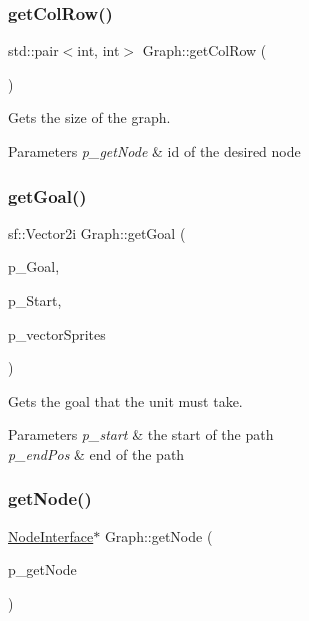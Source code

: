 \subsubsection{\texorpdfstring{get\+Col\+Row()}{getColRow()}}
{\footnotesize\ttfamily std\+::pair$<$int, int$>$ Graph\+::get\+Col\+Row (\begin{DoxyParamCaption}{ }\end{DoxyParamCaption})}



Gets the size of the graph. 


\begin{DoxyParams}{Parameters}
{\em p\+\_\+get\+Node} & id of the desired node \\
\hline
\end{DoxyParams}
\mbox{\label{class_graph_aff088c38171a1a97a8a956e24f40474c}} 
\subsubsection{\texorpdfstring{get\+Goal()}{getGoal()}}
{\footnotesize\ttfamily sf\+::\+Vector2i Graph\+::get\+Goal (\begin{DoxyParamCaption}\item[{\mbox{\hyperlink{class_node_interface}{Node\+Interface}} $\ast$}]{p\+\_\+\+Goal,  }\item[{\mbox{\hyperlink{class_node_interface}{Node\+Interface}} $\ast$}]{p\+\_\+\+Start,  }\item[{std\+::vector$<$ \mbox{\hyperlink{class_sprite_interface}{Sprite\+Interface}} $\ast$$>$}]{p\+\_\+vector\+Sprites }\end{DoxyParamCaption})}



Gets the goal that the unit must take. 


\begin{DoxyParams}{Parameters}
{\em p\+\_\+start} & the start of the path \\
\hline
{\em p\+\_\+end\+Pos} & end of the path \\
\hline
\end{DoxyParams}
\mbox{\label{class_graph_a673511cfc6e5e532dfd881e63e852a13}} 
\subsubsection{\texorpdfstring{get\+Node()}{getNode()}}
{\footnotesize\ttfamily \mbox{\hyperlink{class_node_interface}{Node\+Interface}}$\ast$ Graph\+::get\+Node (\begin{DoxyParamCaption}\item[{sf\+::\+Vector2i}]{p\+\_\+get\+Node }\end{DoxyParamCaption})}



